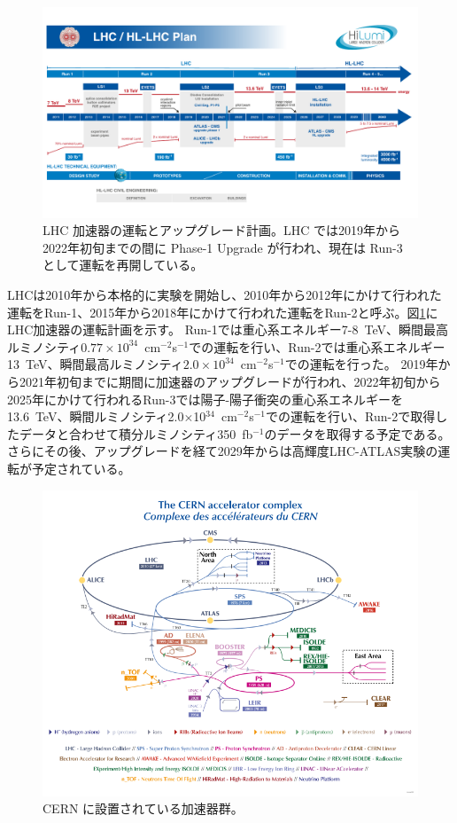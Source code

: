 \begin{figure}[tb]
  \centering
  \includegraphics[clip, width=14cm]{fig/1/HL-LHC_Janvier2022.pdf}
  \caption{LHC 加速器の運転とアップグレード計画。LHC では2019年から2022年初旬までの間に Phase-1 Upgrade が行われ、現在は Run-3 として運転を再開している\cite{article:LHCDesignReport}。}
  \label{fig:LHC_Plan}
\end{figure}

LHCは2010年から本格的に実験を開始し、2010年から2012年にかけて行われた運転をRun-1、2015年から2018年にかけて行われた運転をRun-2と呼ぶ。図\ref{fig:LHC_Plan}にLHC加速器の運転計画を示す\cite{article:LHCDesignReport}。
Run-1では重心系エネルギー7-8~TeV、瞬間最高ルミノシティ$0.77\times10^{34}$~cm$^{-2}$s$^{-1}$での運転を行い、Run-2では重心系エネルギー13~TeV、瞬間最高ルミノシティ$2.0\times10^{34}$~cm$^{-2}$s$^{-1}$での運転を行った。
2019年から2021年初旬までに期間に加速器のアップグレードが行われ、2022年初旬から2025年にかけて行われるRun-3では陽子-陽子衝突の重心系エネルギーを 13.6~TeV、瞬間ルミノシティ2.0$\times$10$^{34}$~cm$^{-2}$s$^{-1}$での運転を行い、Run-2で取得したデータと合わせて積分ルミノシティ350~fb$^{-1}$のデータを取得する予定である。さらにその後、アップグレードを経て2029年からは高輝度LHC-ATLAS実験の運転が予定されている。

\begin{figure}[tb]
  \centering
  \includegraphics[clip, width=14cm]{fig/2/CCC-v2022.pdf}
  \caption{CERN に設置されている加速器群\cite{article:accelerator-complex}。}
  \label{fig:LHC加速器}
\end{figure}


